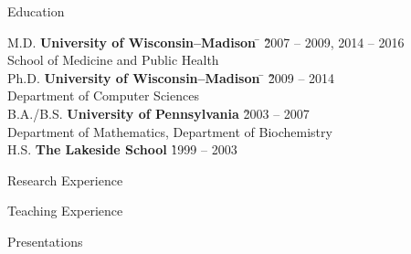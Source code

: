 \documentclass{resume2} %
\begin{document}

\begin{rSection}{Education}

\begin{tabbing}
M.D.  \hspace*{2.32 em}\= \textbf{University of Wisconsin--Madison} \hspace*{5em} \= \hspace*{5em} \= \` 2007 -- 2009, 2014 -- 2016\\
\> School of Medicine and Public Health \\
Ph.D. \hspace*{2 em}\= \textbf{University of Wisconsin--Madison} \hspace*{5em} \= \hspace*{10em} \= \` 2009 -- 2014\\
\> Department of Computer Sciences \\
%
B.A./B.S. \hspace*{2 em}\> \textbf{University of Pennsylvania} \> \> \` 2003 -- 2007 \\
\> Department of Mathematics, Department of Biochemistry \\
%
H.S.\hspace*{2 em}\> \textbf{The Lakeside School} \> \> \` 1999 -- 2003 \\
\end{tabbing}
\end{rSection}

\begin{rSection}{Research Experience}

\end{rSection}

\begin{rSection}{Teaching Experience}

\end{rSection}

\begin{rSection}{Presentations}

\end{rSection}
\end{document}
